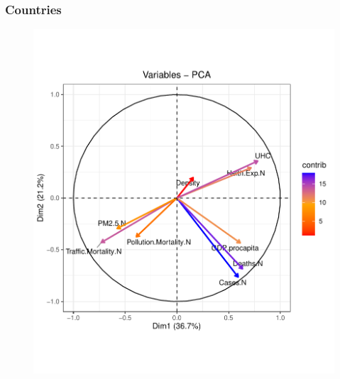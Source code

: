 \documentclass[compress]{beamer}
\begin{document}
\begin{frame}
\begin{figure}[H]
\begin{minipage}{.3\textwidth}
\end{minipage}
\end{figure}
\end{frame}

\begin{frame}
\frametitle{Countries}
\begin{figure}[H]
\centering
\begin{minipage}{.5\textwidth}
  \centering
  \includegraphics[width=\linewidth, ]{Pic/PCA-Loadings_WORLD.pdf}
\end{minipage}%
\begin{minipage}{.5\textwidth}
  \centering

\end{minipage}
\end{figure}
\end{frame}
\end{document}
